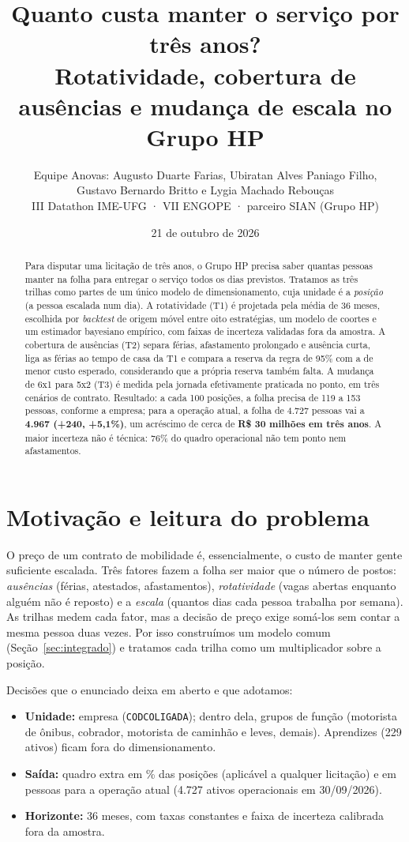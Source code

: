 \documentclass[11pt,a4paper]{article}
\title{\textbf{Quanto custa manter o serviço por três anos?}\\[2pt]
\large Rotatividade, cobertura de ausências e mudança de escala no Grupo HP}
\author{Equipe Anovas: Augusto Duarte Farias, Ubiratan Alves Paniago Filho,\\ Gustavo Bernardo Britto e Lygia Machado Rebouças\\[2pt]
\small III Datathon IME-UFG · VII ENGOPE · parceiro SIAN (Grupo HP)}
\date{21 de outubro de 2026}
\newcommand{\destaque}[1]{\textbf{#1}}
\begin{document}
\maketitle

\begin{abstract}
\noindent Para disputar uma licitação de três anos, o Grupo HP precisa saber quantas pessoas manter na folha para entregar o serviço todos os dias previstos. Tratamos as três trilhas como partes de um único modelo de dimensionamento, cuja unidade é a \emph{posição} (a pessoa escalada num dia). A rotatividade (T1) é projetada pela média de 36 meses, escolhida por \emph{backtest} de origem móvel entre oito estratégias, um modelo de coortes e um estimador bayesiano empírico, com faixas de incerteza validadas fora da amostra. A cobertura de ausências (T2) separa férias, afastamento prolongado e ausência curta, liga as férias ao tempo de casa da T1 e compara a reserva da regra de 95\% com a de menor custo esperado, considerando que a própria reserva também falta. A mudança de 6x1 para 5x2 (T3) é medida pela jornada efetivamente praticada no ponto, em três cenários de contrato. Resultado: a cada 100 posições, a folha precisa de 119 a 153 pessoas, conforme a empresa; para a operação atual, a folha de 4.727 pessoas vai a \destaque{4.967 (+240, +5,1\%)}, um acréscimo de cerca de \destaque{R\$ 30 milhões em três anos}. A maior incerteza não é técnica: 76\% do quadro operacional não tem ponto nem afastamentos.
\end{abstract}

\section{Motivação e leitura do problema}
O preço de um contrato de mobilidade é, essencialmente, o custo de manter gente suficiente escalada. Três fatores fazem a folha ser maior que o número de postos: \emph{ausências} (férias, atestados, afastamentos), \emph{rotatividade} (vagas abertas enquanto alguém não é reposto) e a \emph{escala} (quantos dias cada pessoa trabalha por semana). As trilhas medem cada fator, mas a decisão de preço exige somá-los sem contar a mesma pessoa duas vezes. Por isso construímos um modelo comum (Seção~\ref{sec:integrado}) e tratamos cada trilha como um multiplicador sobre a posição.

\noindent Decisões que o enunciado deixa em aberto e que adotamos:
\begin{itemize}
\item \textbf{Unidade:} empresa (\texttt{CODCOLIGADA}); dentro dela, grupos de função (motorista de ônibus, cobrador, motorista de caminhão e leves, demais). Aprendizes (229 ativos) ficam fora do dimensionamento.
\item \textbf{Saída:} quadro extra em \% das posições (aplicável a qualquer licitação) e em pessoas para a operação atual (4.727 ativos operacionais em 30/09/2026).
\item \textbf{Horizonte:} 36 meses, com taxas constantes e faixa de incerteza calibrada fora da amostra.
\end{itemize}
\end{document}
